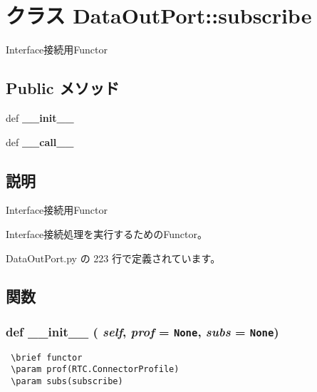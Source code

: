 \section{クラス DataOutPort::subscribe}
\label{classsource__py_1_1_data_out_port_1_1_data_out_port_1_1subscribe}
Interface接続用Functor  


\subsection*{Public メソッド}
\begin{CompactItemize}
\item 
def {\bf \_\-\_\-init\_\-\_\-}
\item 
def {\bf \_\-\_\-call\_\-\_\-}
\end{CompactItemize}


\subsection{説明}
Interface接続用Functor 

Interface接続処理を実行するためのFunctor。 

 DataOutPort.py の 223 行で定義されています。

\subsection{関数}
\subsubsection{\setlength{\rightskip}{0pt plus 5cm}def \_\-\_\-init\_\-\_\- ( {\em self},  {\em prof} = {\tt None},  {\em subs} = {\tt None})}\label{classsource__py_1_1_data_out_port_1_1_data_out_port_1_1subscribe_c775ee34451fdfa742b318538164070e}




\footnotesize\begin{verbatim}
 \brief functor
 \param prof(RTC.ConnectorProfile)
 \param subs(subscribe)
\end{verbatim}
\normalsize
 


